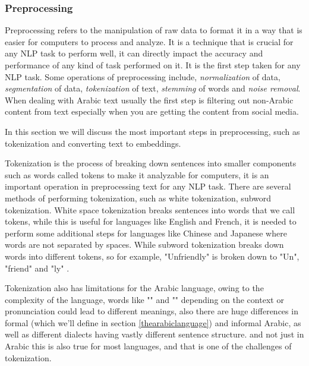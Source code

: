 \documentclass[12pt]{diazessay}
\newcounter{subsubsubsection}[subsubsection]
\begin{document}
        
        \subsubsection{Preprocessing}
            Preprocessing refers to the manipulation of raw data to format it in a way that is easier for computers to process and analyze. It is a technique that is crucial for any NLP task to perform well, it can directly impact the accuracy and performance of any kind of task performed on it. It is the first step taken for any NLP task. Some operations of preprocessing include, \emph{normalization} of data, \emph{segmentation} of data, \emph{tokenization} of text, \emph{stemming} of words and \emph{noise removal}. When dealing with Arabic text usually the first step is filtering out non-Arabic content from text especially when you are getting the content from social media.
            
            In this section we will discuss the most important steps in preprocessing, such as tokenization and converting text to embeddings.


            Tokenization is the process of breaking down sentences into smaller components such as words called tokens to make it analyzable for computers, it is an important operation in preprocessing text for any NLP task. There are several methods of performing tokenization, such as white tokenization, subword tokenization. White space tokenization breaks sentences into words that we call tokens, while this is useful for languages like English and French, it is needed to perform some additional steps for languages like Chinese and Japanese where words are not separated by spaces. While subword tokenization breaks down words into different tokens, so for example, "Unfriendly" is broken down to "Un", "friend" and "ly" \cite{subword_tokenization}.
            
            Tokenization also has limitations for the Arabic language, owing to the complexity of the language, words like "" and "" depending on the context or pronunciation could lead to different meanings, also there are huge differences in formal (which we'll define in section \ref{thearabiclanguage}) and informal Arabic, as well as different dialects having vastly different sentence structure. and not just in Arabic this is also true for most languages, and that is one of the challenges of tokenization.
    
\end{document}
